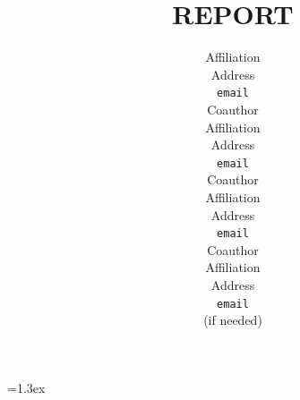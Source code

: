 \def\eqvsp{}  \newdimen\paravsp  \paravsp=1.3ex
\def\paradot#1{\vspace{\paravsp plus 0.5\paravsp minus 0.5\paravsp}\noindent{\bf\boldmath{#1.}}}

\title{
REPORT
}


\author{
Affiliation \\
Address \\
\texttt{email} \\
\AND
Coauthor \\
Affiliation \\
Address \\
\texttt{email} \\
\And
Coauthor \\
Affiliation \\
Address \\
\texttt{email} \\
\And
Coauthor \\
Affiliation \\
Address \\
\texttt{email} \\
(if needed)\\
}

%

\newcommand{\fix}{\marginpar{FIX}}
\newcommand{\new}{\marginpar{NEW}}




\maketitle


